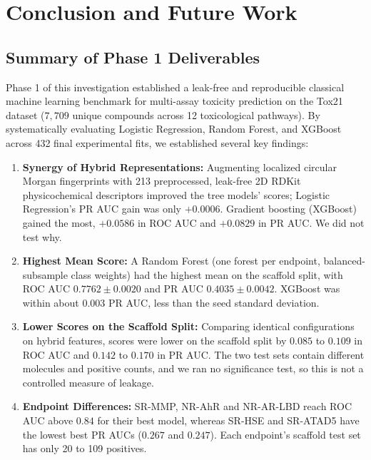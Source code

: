 \section{Conclusion and Future Work}
\label{sec:conclusion}

\subsection{Summary of Phase 1 Deliverables}
Phase 1 of this investigation established a leak-free and reproducible classical machine learning benchmark for multi-assay toxicity prediction on the Tox21 dataset ($7{,}709$ unique compounds across 12 toxicological pathways). By systematically evaluating Logistic Regression, Random Forest, and XGBoost across 432 final experimental fits, we established several key findings:
\begin{enumerate}
    \item \textbf{Synergy of Hybrid Representations:} Augmenting localized circular Morgan fingerprints with 213 preprocessed, leak-free 2D RDKit physicochemical descriptors improved the tree models' scores; Logistic Regression's PR AUC gain was only $+0.0006$. Gradient boosting (XGBoost) gained the most, $+0.0586$ in ROC AUC and $+0.0829$ in PR AUC. We did not test why.
    \item \textbf{Highest Mean Score:} A Random Forest (one forest per endpoint, balanced-subsample class weights) had the highest mean on the scaffold split, with ROC AUC $0.7762 \pm 0.0020$ and PR AUC $0.4035 \pm 0.0042$. XGBoost was within about $0.003$ PR AUC, less than the seed standard deviation.
    \item \textbf{Lower Scores on the Scaffold Split:} Comparing identical configurations on hybrid features, scores were lower on the scaffold split by $0.085$ to $0.109$ in ROC AUC and $0.142$ to $0.170$ in PR AUC. The two test sets contain different molecules and positive counts, and we ran no significance test, so this is not a controlled measure of leakage.
    \item \textbf{Endpoint Differences:} SR-MMP, NR-AhR and NR-AR-LBD reach ROC AUC above $0.84$ for their best model, whereas SR-HSE and SR-ATAD5 have the lowest best PR AUCs ($0.267$ and $0.247$). Each endpoint's scaffold test set has only 20 to 109 positives.
\end{enumerate}

